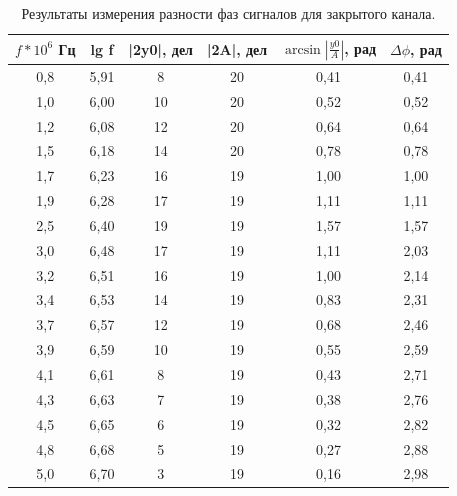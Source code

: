 \documentclass[12pt,a4paper]{article}
\begin{document}
	\begin{table}[]
	\begin{center}
		\begin{tabular}{|c|c|c|c|c|c|}
			\hline
			$ f * 10^{6}$ Гц      & lg f & |2y0|, дел & |2A|, дел & $\arcsin\left|\frac{y0}{A}\right|$, рад & $\Delta\phi$, рад \\ \hline
			0,8  & 5,91 & 8     & 20   & 0,41   & 0,41     \\ \hline
			1,0 & 6,00 & 10    & 20   & 0,52   & 0,52     \\ \hline
			1,2 & 6,08 & 12    & 20   & 0,64   & 0,64     \\ \hline
			1,5 & 6,18 & 14    & 20   & 0,78   & 0,78     \\ \hline
			1,7 & 6,23 & 16    & 19   & 1,00   & 1,00     \\ \hline
			1,9 & 6,28 & 17    & 19   & 1,11   & 1,11     \\ \hline
			2,5 & 6,40 & 19    & 19   & 1,57   & 1,57     \\ \hline
			3,0 & 6,48 & 17    & 19   & 1,11   & 2,03     \\ \hline	
			3,2 & 6,51 & 16    & 19   & 1,00   & 2,14     \\ \hline	
			3,4 & 6,53 & 14    & 19   & 0,83   & 2,31     \\ \hline
			3,7 & 6,57 & 12    & 19   & 0,68   & 2,46     \\ \hline
			3,9 & 6,59 & 10    & 19   & 0,55   & 2,59     \\ \hline
			4,1 & 6,61 & 8     & 19   & 0,43   & 2,71     \\ \hline
			4,3 & 6,63 & 7     & 19   & 0,38   & 2,76     \\ \hline
			4,5 & 6,65 & 6     & 19   & 0,32   & 2,82     \\ \hline
			4,8 & 6,68 & 5     & 19   & 0,27   & 2,88     \\ \hline
			5,0 & 6,70 & 3     & 19   & 0,16   & 2,98     \\ \hline
		\end{tabular}
		\caption{Результаты измерения разности фаз сигналов для закрытого канала.}
		\label{tab:delta_phases_AC}
	\end{center}
	\end{table}
	
	
	
\end{document}
